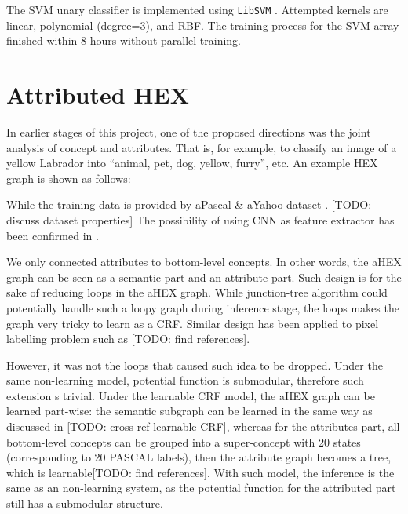\documentclass[11pt,a4paper]{article}
\begin{document}
The SVM unary classifier is implemented using \texttt{LibSVM} \cite{CC01a}. Attempted kernels are linear, polynomial (degree=3), and RBF. The training process for the SVM array finished within 8 hours without parallel training.

\section{Attributed HEX}

In earlier stages of this project, one of the proposed directions was the joint analysis of concept and attributes. That is, for example, to classify an image of a yellow Labrador into ``animal, pet, dog, yellow, furry'', etc. An example HEX graph is shown as follows:

While the training data is provided by aPascal \& aYahoo dataset \cite{farhadi2009describing}. [TODO: discuss dataset properties] The possibility of using CNN as feature extractor has been confirmed in \cite{razavian2014cnn}.

We only connected attributes to bottom-level concepts. In other words, the aHEX graph can be seen as a semantic part and an attribute part. Such design is for the sake of reducing loops in the aHEX graph. While junction-tree algorithm could potentially handle such a loopy graph during inference stage, the loops makes the graph very tricky to learn as a CRF. Similar design has been applied to pixel labelling problem such as [TODO: find references].

However, it was not the loops that caused such idea to be dropped. Under the same non-learning model, potential function is submodular, therefore such extension s trivial. Under the learnable CRF model, the aHEX graph can be learned part-wise: the semantic subgraph can be learned in the same way as discussed in [TODO: cross-ref learnable CRF], whereas for the attributes part, all bottom-level concepts can be grouped into a super-concept with 20 states (corresponding to 20 PASCAL labels), then the attribute graph becomes a tree, which is learnable[TODO: find references]. With such model, the inference is the same as an non-learning system, as the potential function for the attributed part still has a submodular structure.

\clearpage


\end{document}
